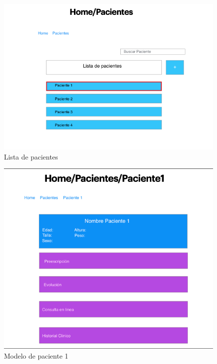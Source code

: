 \documentclass[12pt]{article}
\begin{document}
\begin{figure}[ht]
\centering
\includegraphics[scale=0.4]{imag/P4.png}
\caption{Lista de pacientes }
\label{56}
\end{figure}
\FloatBarrier


\begin{figure}[ht]
\centering
\includegraphics[scale=0.4]{imag/P5.png}
\caption{Modelo de paciente 1 }
\label{57}
\end{figure}
\FloatBarrier
\end{document}

